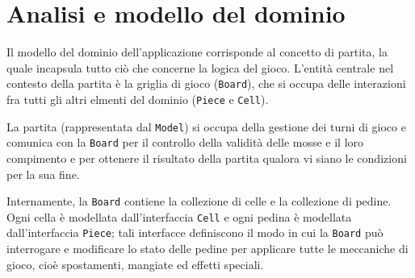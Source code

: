 \documentclass[a4paper,12pt]{report}
\begin{document}
\section{Analisi e modello del dominio}

Il modello del dominio dell'applicazione corrisponde al concetto di partita, la quale incapsula tutto ciò che concerne la logica del gioco. L'entità centrale nel contesto della partita è la griglia di gioco (\texttt{Board}), che si occupa delle interazioni fra tutti gli altri elmenti del dominio (\texttt{Piece} e \texttt{Cell}).

La partita (rappresentata dal \texttt{Model}) si occupa della gestione dei turni di gioco e comunica con la \texttt{Board} per il controllo della validità delle mosse e il loro compimento e per ottenere il risultato della partita qualora vi siano le condizioni per la sua fine.

Internamente, la \texttt{Board} contiene la collezione di celle e la collezione di pedine. Ogni cella è modellata dall'interfaccia \texttt{Cell} e ogni pedina è modellata dall'interfaccia \texttt{Piece}; tali interfacce definiscono il modo in cui la \texttt{Board} può interrogare e modificare lo stato delle pedine per applicare tutte le meccaniche di gioco, cioè spostamenti, mangiate ed effetti speciali.
\end{document}
